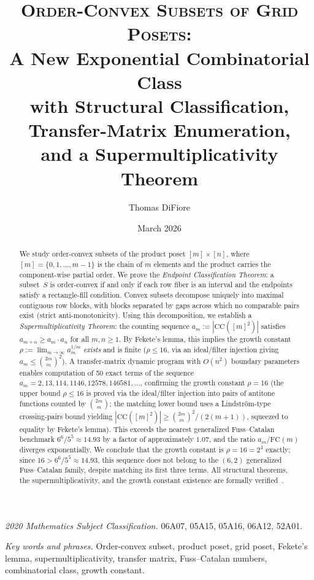 \documentclass[11pt,a4paper]{article}
\title{\textsc{Order-Convex Subsets of Grid Posets}:\\[6pt]
A New Exponential Combinatorial Class\\[4pt]
{\large with Structural Classification, Transfer-Matrix Enumeration,\\
and a Supermultiplicativity Theorem}}
\author{Thomas DiFiore}
\date{March 2026}
\theoremstyle{plain}
\theoremstyle{definition}
\theoremstyle{remark}
\newcommand{\CC}{\mathrm{CC}}
\begin{document}
\maketitle

\begin{abstract}
We study order-convex subsets of the product poset $[m] \times [n]$, where $[m] = \{0, 1, \ldots, m-1\}$ is the chain of $m$ elements and the product carries the component-wise partial order.
We prove the \emph{Endpoint Classification Theorem}: a subset~$S$ is order-convex if and only if each row fiber is an interval and the endpoints satisfy a rectangle-fill condition.
Convex subsets decompose uniquely into maximal contiguous row blocks, with blocks separated by gaps across which no comparable pairs exist (strict anti-monotonicity).
Using this decomposition, we establish a \emph{Supermultiplicativity Theorem}: the counting sequence $a_m := |\CC([m]^2)|$ satisfies $a_{m+n} \geq a_m \cdot a_n$ for all $m, n \geq 1$.
By Fekete's lemma, this implies the growth constant $\rho := \lim_{m \to \infty} a_m^{1/m}$ \emph{exists} and is finite ($\rho \leq 16$, via an ideal/filter injection giving $a_m \leq \binom{2m}{m}^2$).
A transfer-matrix dynamic program with $O(n^2)$ boundary parameters enables computation of 50 exact terms of the sequence $a_m = 2, 13, 114, 1146, 12578, 146581, \ldots$, confirming the growth constant $\rho = 16$ (the upper bound $\rho \leq 16$ is proved via the ideal/filter injection into pairs of antitone functions counted by $\binom{2m}{m}$; the matching lower bound uses a Lindstr\"om-type crossing-pairs bound yielding $|\mathrm{CC}([m]^2)| \geq \binom{2m}{m}^2\!/(2(m{+}1))$, squeezed to equality by Fekete's lemma).
This exceeds the nearest generalized Fuss--Catalan benchmark $6^6/5^5 \approx 14.93$ by a factor of approximately $1.07$, and the ratio $a_m / \mathrm{FC}(m)$ diverges exponentially.
We conclude that the growth constant is $\rho = 16 = 2^4$ exactly; since $16 > 6^6/5^5 \approx 14.93$, this sequence does not belong to the $(6,2)$ generalized Fuss--Catalan family, despite matching its first three terms.
All structural theorems, the supermultiplicativity, and the growth constant existence are formally verified~\cite{leanrepo}.
\end{abstract}

\medskip

\noindent\textit{2020 Mathematics Subject Classification.}
06A07, 05A15, 05A16, 06A12, 52A01.

\smallskip

\noindent\textit{Key words and phrases.}
Order-convex subset, product poset, grid poset, Fekete's lemma, supermultiplicativity, transfer matrix, Fuss--Catalan numbers, combinatorial class, growth constant.
\end{document}
